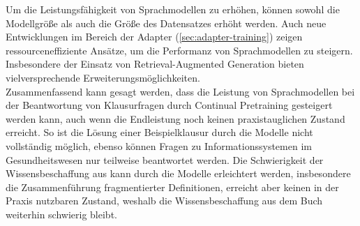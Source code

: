 Um die Leistungsfähigkeit von Sprachmodellen zu erhöhen, können sowohl die Modellgröße als auch die Größe des Datensatzes erhöht werden.
Auch neue Entwicklungen im Bereich der Adapter (\cref{sec:adapter-training}) zeigen ressourceneffiziente Ansätze, um die Performanz von Sprachmodellen zu steigern.
Insbesondere der Einsatz von Retrieval-Augmented Generation bieten vielversprechende Erweiterungsmöglichkeiten.\\

Zusammenfassend kann gesagt werden, dass die Leistung von Sprachmodellen bei der Beantwortung von Klausurfragen durch Continual Pretraining gesteigert werden kann, auch wenn die Endleistung noch keinen praxistauglichen Zustand erreicht.
So ist die Lösung einer Beispielklausur durch die Modelle nicht vollständig möglich, ebenso können Fragen zu Informationssystemen im Gesundheitswesen nur teilweise beantwortet werden.
Die Schwierigkeit der Wissensbeschaffung aus \citet{bb} kann durch die Modelle erleichtert werden, insbesondere die Zusammenführung fragmentierter Definitionen, erreicht aber keinen in der Praxis nutzbaren Zustand, weshalb die Wissensbeschaffung aus dem Buch weiterhin schwierig bleibt.\\

\vfill

